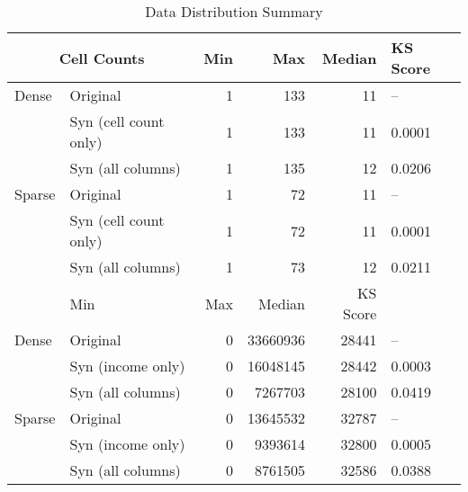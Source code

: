 \begin{table}[htbp]
\centering
\small
\caption{Data Distribution Summary}
\label{tab:region}
\begin{tabular}{llrrrl}
\toprule
\multicolumn{2}{c}{\textbf{Cell Counts}} & Min & Max & Median & KS Score \\
\midrule
Dense & Original & 1 & 133 & 11 & -- \\
 & Syn (cell count only) & 1 & 133 & 11 & 0.0001 \\
 & Syn (all columns) & 1 & 135 & 12 & 0.0206 \\
\addlinespace
Sparse & Original & 1 & 72 & 11 & -- \\
 & Syn (cell count only) & 1 & 72 & 11 & 0.0001 \\
 & Syn (all columns) & 1 & 73 & 12 & 0.0211 \\
\addlinespace
\midrule
\multicolumn{2}{c}{\textbf{Income}} & Min & Max & Median & KS Score \\
\midrule
Dense & Original & 0 & 33660936 & 28441 & -- \\
 & Syn (income only) & 0 & 16048145 & 28442 & 0.0003 \\
 & Syn (all columns) & 0 & 7267703 & 28100 & 0.0419 \\
\addlinespace
Sparse & Original & 0 & 13645532 & 32787 & -- \\
 & Syn (income only) & 0 & 9393614 & 32800 & 0.0005 \\
 & Syn (all columns) & 0 & 8761505 & 32586 & 0.0388 \\
\bottomrule
\end{tabular}
\end{table}
